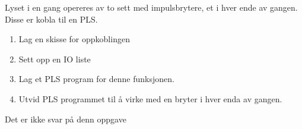 

Lyset i en gang opereres av to sett med impulsbrytere, et i hver ende
av gangen. Disse er kobla til en PLS.
\begin{enumerate}
\item Lag en skisse for oppkoblingen
\item Sett opp en IO liste
\item Lag et PLS program for denne funksjonen.
\item Utvid PLS programmet til å virke med en bryter i hver enda av gangen. 
\end{enumerate}
\vskip 10pt





Det er ikke svar på denn oppgave












